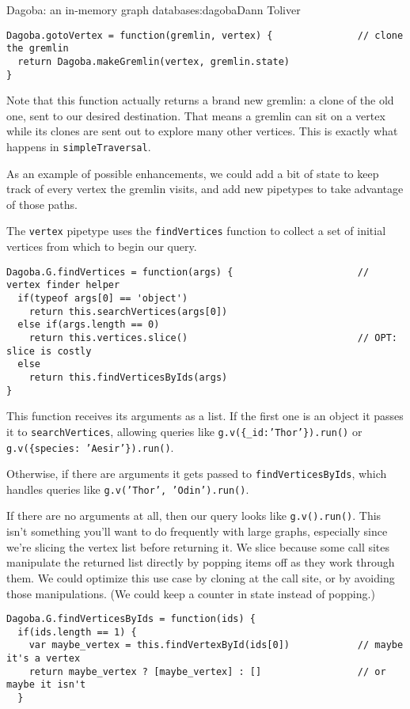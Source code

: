 \begin{aosachapter}{Dagoba: an in-memory graph database}{s:dagoba}{Dann Toliver}
\begin{verbatim}
Dagoba.gotoVertex = function(gremlin, vertex) {               // clone the gremlin
  return Dagoba.makeGremlin(vertex, gremlin.state)
}
\end{verbatim}

Note that this function actually returns a brand new gremlin: a clone of
the old one, sent to our desired destination. That means a gremlin can
sit on a vertex while its clones are sent out to explore many other
vertices. This is exactly what happens in \texttt{simpleTraversal}.

As an example of possible enhancements, we could add a bit of state to
keep track of every vertex the gremlin visits, and add new pipetypes to
take advantage of those paths.

\label{finding}

The \texttt{vertex} pipetype uses the \texttt{findVertices} function to
collect a set of initial vertices from which to begin our query.

\begin{verbatim}
Dagoba.G.findVertices = function(args) {                      // vertex finder helper
  if(typeof args[0] == 'object')
    return this.searchVertices(args[0])
  else if(args.length == 0)
    return this.vertices.slice()                              // OPT: slice is costly
  else
    return this.findVerticesByIds(args)
}
\end{verbatim}

This function receives its arguments as a list. If the first one is an
object it passes it to \texttt{searchVertices}, allowing queries like
\texttt{g.v(\{\_id:'Thor'\}).run()} or
\texttt{g.v(\{species: 'Aesir'\}).run()}.

Otherwise, if there are arguments it gets passed to
\texttt{findVerticesByIds}, which handles queries like
\texttt{g.v('Thor', 'Odin').run()}.

If there are no arguments at all, then our query looks like
\texttt{g.v().run()}. This isn't something you'll want to do frequently
with large graphs, especially since we're slicing the vertex list before
returning it. We slice because some call sites manipulate the returned
list directly by popping items off as they work through them. We could
optimize this use case by cloning at the call site, or by avoiding those
manipulations. (We could keep a counter in state instead of popping.)

\begin{verbatim}
Dagoba.G.findVerticesByIds = function(ids) {
  if(ids.length == 1) {
    var maybe_vertex = this.findVertexById(ids[0])            // maybe it's a vertex
    return maybe_vertex ? [maybe_vertex] : []                 // or maybe it isn't
  }


\end{verbatim}
\end{aosachapter}
